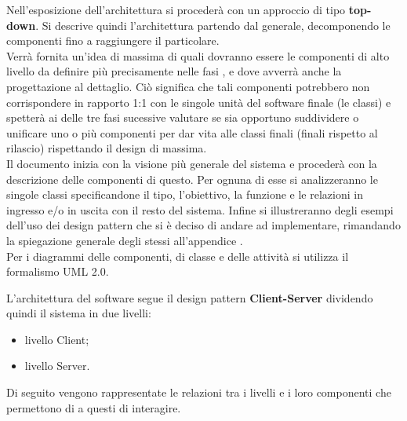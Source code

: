 Nell'esposizione dell'architettura si procederà con un approccio di tipo \textbf{top-down}. Si descrive quindi l’architettura partendo dal generale, decomponendo le componenti fino a raggiungere il particolare.\\
Verrà fornita un'idea di massima di quali dovranno essere le componenti di alto livello da definire più precisamente nelle fasi ,  e  dove avverrà anche la progettazione al dettaglio. Ciò significa che tali componenti potrebbero non corrispondere in rapporto 1:1 con le singole unità del software finale (le classi) e spetterà ai  delle tre fasi sucessive valutare se sia opportuno suddividere o unificare uno o più componenti per dar vita alle classi finali (finali rispetto al rilascio) rispettando il design di massima.\\
Il documento inizia con la visione più generale del sistema e procederà con la descrizione delle componenti di questo. Per ognuna di esse si analizzeranno le singole classi specificandone il tipo, l'obiettivo, la funzione e le relazioni in ingresso e/o in uscita con il resto del sistema. Infine si illustreranno degli esempi dell'uso dei design pattern che si è deciso di andare ad implementare, rimandando la spiegazione generale degli stessi all'appendice .\\
Per i diagrammi delle componenti, di classe e delle attività si utilizza il formalismo UML 2.0. 


L'architettura del software segue il design pattern \textbf{Client-Server} dividendo quindi il sistema in due livelli:
\begin{itemize}
	\item{livello Client};
	\item{livello Server}.
\end{itemize}
Di seguito vengono rappresentate le relazioni tra i livelli e i loro componenti che permettono di a questi di interagire.



